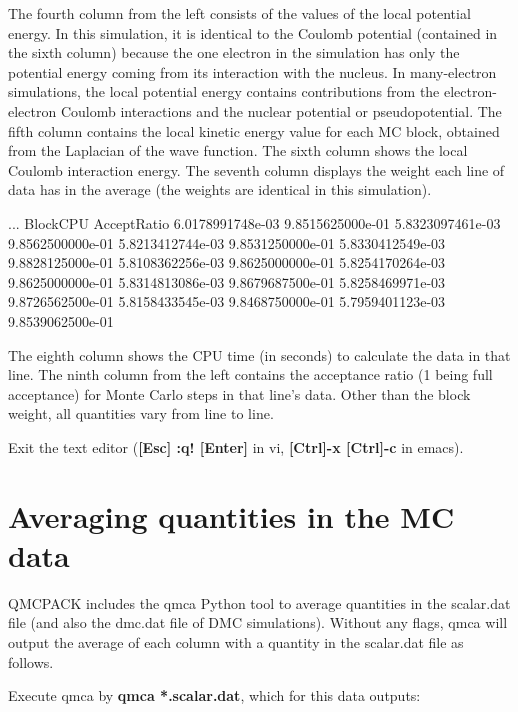 The fourth column from the left consists of the values of the local potential
energy.  In this simulation, it is identical to the Coulomb potential
(contained in the sixth column) because the one electron in the simulation has
only the potential energy coming from its interaction with the nucleus.  In
many-electron simulations, the local potential energy contains contributions
from the electron-electron Coulomb interactions and the nuclear potential or
pseudopotential.  The fifth column contains the local kinetic energy value for
each MC block, obtained from the Laplacian of the wave function.  The sixth
column shows the local Coulomb interaction energy.  The seventh column displays
the weight each line of data has in the average (the weights are identical in
this simulation).   

\begin{shade} 
...    BlockCPU            AcceptRatio         
       6.0178991748e-03    9.8515625000e-01
       5.8323097461e-03    9.8562500000e-01
       5.8213412744e-03    9.8531250000e-01
       5.8330412549e-03    9.8828125000e-01
       5.8108362256e-03    9.8625000000e-01
       5.8254170264e-03    9.8625000000e-01
       5.8314813086e-03    9.8679687500e-01
       5.8258469971e-03    9.8726562500e-01
       5.8158433545e-03    9.8468750000e-01
       5.7959401123e-03    9.8539062500e-01
\end{shade}

The eighth column shows the CPU time (in seconds) to calculate the data in that
line.  The ninth column from the left contains the acceptance ratio (1 being
full acceptance) for Monte Carlo steps in that line's data.  Other than the
block weight, all quantities vary from line to line.

Exit the text editor (\textbf{[Esc] :q! [Enter]} in vi, \textbf{[Ctrl]-x [Ctrl]-c} in
emacs).

\section{Averaging quantities in the MC data}
\label{sec:averaging} 

QMCPACK includes the qmca Python tool to average quantities in the scalar.dat file (and
also the dmc.dat file of DMC simulations).  Without any flags, qmca will output
the average of each column with a quantity in the scalar.dat file as follows. 

Execute qmca by \textbf{qmca *.scalar.dat}, which for this data outputs:

